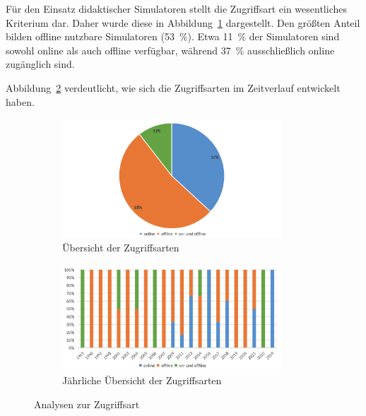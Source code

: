 Für den Einsatz didaktischer Simulatoren stellt die Zugriffsart ein wesentliches Kriterium dar. Daher wurde diese in Abbildung~\ref{fig:3-zugriff} dargestellt. Den größten Anteil bilden offline nutzbare Simulatoren (53~\%). Etwa 11~\% der Simulatoren sind sowohl online als auch offline verfügbar, während 37~\% ausschließlich online zugänglich sind.

Abbildung~\ref{fig:4-zugriff-jahr} verdeutlicht, wie sich die Zugriffsarten im Zeitverlauf entwickelt haben.

\begin{figure}[!htbp]
    \centering
    \begin{subfigure}[b]{0.48\textwidth}
        \centering
        \includegraphics[width=0.90\textwidth]{graphics_sim/3-zugriff.png}
        \caption{Übersicht der Zugriffsarten}
        \label{fig:3-zugriff}
    \end{subfigure}
    \hfill
    \begin{subfigure}[b]{0.48\textwidth}
        \centering
        \includegraphics[width=0.90\textwidth]{graphics_sim/4-zugriff-jahr.png}
        \caption{Jährliche Übersicht der Zugriffsarten}
        \label{fig:4-zugriff-jahr}
    \end{subfigure}
    \caption{Analysen zur Zugriffsart}
    \label{fig:zugriff-gesamt}
\end{figure}

